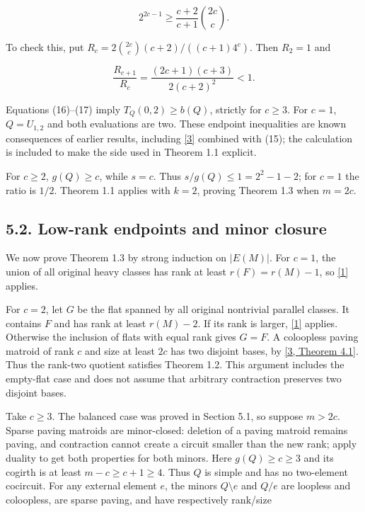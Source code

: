 \documentclass[11pt]{article}
\begin{document}
\[
2^{2c-1}\ge\frac{c+2}{c+1}\binom{2c}{c}. \tag{17}
\]

To check this, put \(R_c=2\binom{2c}{c}(c+2)/((c+1)4^c)\). Then \(R_2=1\) and

\[
\frac{R_{c+1}}{R_c}=\frac{(2c+1)(c+3)}{2(c+2)^2}<1.
\]

Equations (16)--(17) imply \(T_Q(0,2)\ge b(Q)\), strictly for \(c\ge3\). For \(c=1\), \(Q=U_{1,2}\) and both evaluations are two. These endpoint inequalities are known consequences of earlier results, including \hyperlink{ref3}{[3]} combined with (15); the calculation is included to make the side used in Theorem 1.1 explicit.

For \(c\ge2\), \(g(Q)\ge c\), while \(s=c\). Thus \(s/g(Q)\le1=2^2-1-2\); for \(c=1\) the ratio is \(1/2\). Theorem 1.1 applies with \(k=2\), proving Theorem 1.3 when \(m=2c\).

\subsection*{5.2. Low-rank endpoints and minor closure}

We now prove Theorem 1.3 by strong induction on \(|E(M)|\). For \(c=1\), the union of all original heavy classes has rank at least \(r(F)=r(M)-1\), so \hyperlink{ref1}{[1]} applies.

For \(c=2\), let \(G\) be the flat spanned by all original nontrivial parallel classes. It contains \(F\) and has rank at least \(r(M)-2\). If its rank is larger, \hyperlink{ref1}{[1]} applies. Otherwise the inclusion of flats with equal rank gives \(G=F\). A coloopless paving matroid of rank \(c\) and size at least \(2c\) has two disjoint bases, by \hyperlink{ref3}{[3, Theorem 4.1]}. Thus the rank-two quotient satisfies Theorem 1.2. This argument includes the empty-flat case and does not assume that arbitrary contraction preserves two disjoint bases.

Take \(c\ge3\). The balanced case was proved in Section 5.1, so suppose \(m>2c\). Sparse paving matroids are minor-closed: deletion of a paving matroid remains paving, and contraction cannot create a circuit smaller than the new rank; apply duality to get both properties for both minors. Here \(g(Q)\ge c\ge3\) and its cogirth is at least \(m-c\ge c+1\ge4\). Thus \(Q\) is simple and has no two-element cocircuit. For any external element \(e\), the minors \(Q\setminus e\) and \(Q/e\) are loopless and coloopless, are sparse paving, and have respectively rank/size
\end{document}
